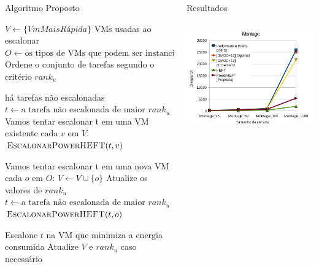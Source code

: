 \documentclass[final]{beamer}
\begin{document}
\begin{frame}[t]
\begin{columns}[t]
\begin{column}{0.35\paperwidth}
\begin{block}{Algoritmo Proposto}
	
	
	\begin{shaded}
	\begin{codebox}
		\li $V \gets \{VmMaisRápida\}$ \Comment VMs usadas ao escalonar
		\li $O \gets \text{os tipos de VMs que podem ser instanciadas}$
		\li Ordene o conjunto de tarefas segundo o critério $rank_u$
	   
		\li \While há tarefas não escalonadas
			\li \Do $t \gets \text{a tarefa não escalonada de maior } rank_u$
		    \li \Comment Vamos tentar escalonar t em uma VM existente
		    \li \For cada $v$ em $V$:
			    \li \Do	$\textnormal{\scshape EscalonarPowerHEFT}(t, v)$
		    \End
		    
		    \li \Comment Vamos tentar escalonar t em uma nova VM
		    \li \For cada $o$ em $O$:
			    \li \Do	$V \gets V \cup \{o\}$
			    \li Atualize os valores de $rank_u$
			    \li $t \gets \text{a tarefa não escalonada de maior } rank_u$
			    \li $\textnormal{\scshape EscalonarPowerHEFT}(t, o)$
		    \End
		    
		    \li Escalone $t$ na VM que minimiza a energia consumida
		    \li Atualize $V$ e $rank_u$ caso necessário
		\End
	\End
	\end{codebox}
	\end{shaded}
	
	\end{block}
	
\end{column}

\begin{column}{0.61\paperwidth} 
\begin{block}{Resultados}


\begin{columns}[t] 
	\begin{column}{0.45\columnwidth}
		\begin{center}
			\includegraphics[width=\columnwidth]{Montage.png}
		\end{center}	


\end{column}
\end{columns}
\end{block}
\end{column}
\end{columns}
\end{frame}
\end{document}
